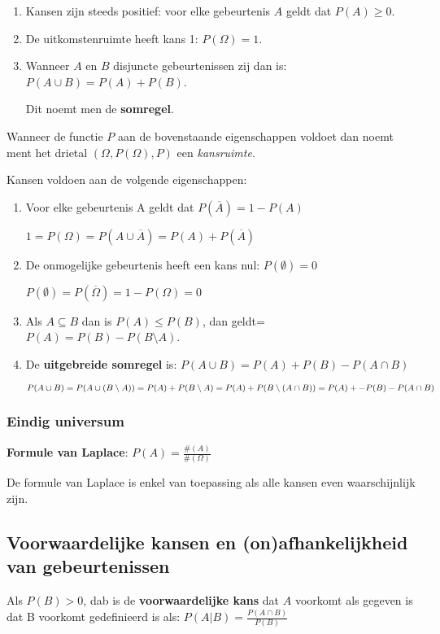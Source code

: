\documentclass[a4paper,12pt]{article}
\begin{document}
\begin{enumerate}
\item Kansen zijn steeds positief: voor elke gebeurtenis $A$ geldt dat $P(A) \geq 0$.
\item De uitkomstenruimte heeft kans 1: $P(\Omega)=1$.
\item Wanneer $A$ en $B$ disjuncte gebeurtenissen zij dan is: $P(A\cup B)=P(A)+P(B)$.

Dit noemt men de \textbf{somregel}.
\end{enumerate}

Wanneer de functie $P$ aan de bovenstaande eigenschappen voldoet dan noemt ment het drietal $(\Omega, P(\Omega), P)$ een \textit{kansruimte}.

Kansen voldoen aan de volgende eigenschappen:
\begin{enumerate}
\item Voor elke gebeurtenis A geldt dat $P(\overline{A}) = 1-P(A)$

$1 = P(\Omega) = P(A\cup \overline{A}) = P(A) + P(\overline{A})$
\item De onmogelijke gebeurtenis heeft een kans nul: $P(\emptyset)=0$

$P(\emptyset)= P(\overline{\Omega}) = 1 - P(\Omega) = 0$
\item Als $A \subseteq B$ dan is $P(A)\leq P(B)$, dan geldt= $P(A) = P(B) - P(B\setminus A)$.
\item De \textbf{uitgebreide somregel} is: $P(A \cup B) = P(A) + P(B) - P(A \cap B)$

$P(A\cup B) = P(A \cup (B\setminus A))\\
= P(A) + P(B\setminus A)\\
= P(A) + P(B\setminus (A \cap B))\\
= P(A) +- P(B) - P(A \cap B)$
\end{enumerate}
\subsubsection{Eindig universum}
\textbf{Formule van Laplace}: $P(A)=\frac{\#(A)}{\#(\Omega)}$

De formule van Laplace is enkel van toepassing als alle kansen even waarschijnlijk zijn.

\subsection{Voorwaardelijke kansen en (on)afhankelijkheid van gebeurtenissen}
Als $P(B)>0$, dab is de \textbf{voorwaardelijke kans} dat $A$ voorkomt als gegeven is dat B voorkomt gedefinieerd is als:
$P(A|B)=\frac{P(A\cap B)}{P(B)}$
\end{document}
